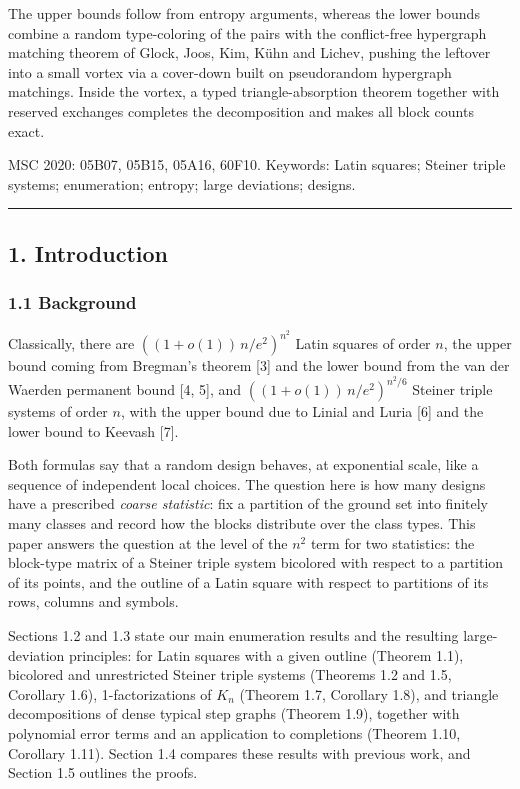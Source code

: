 \documentclass[english,11pt,a4paper]{article}
\begin{document}
The upper bounds follow from entropy arguments, whereas the lower bounds combine a random type-coloring of the pairs with the conflict-free hypergraph matching theorem of Glock, Joos, Kim, Kühn and Lichev, pushing the leftover into a small vortex via a cover-down built on pseudorandom hypergraph matchings. Inside the vortex, a typed triangle-absorption theorem together with reserved exchanges completes the decomposition and makes all block counts exact.

MSC 2020: 05B07, 05B15, 05A16, 60F10. Keywords: Latin squares; Steiner triple systems; enumeration; entropy; large deviations; designs.

\begin{center}\rule{0.5\linewidth}{0.5pt}\end{center}

\subsection{1. Introduction}\label{introduction}

\subsubsection{1.1 Background}\label{background}

Classically, there are \(((1+o(1))\,n/e^2)^{n^2}\) Latin squares of order \(n\), the upper bound coming from Bregman's theorem {[}3{]} and the lower bound from the van der Waerden permanent bound {[}4, 5{]}, and \(((1+o(1))\,n/e^2)^{n^2/6}\) Steiner triple systems of order \(n\), with the upper bound due to Linial and Luria {[}6{]} and the lower bound to Keevash {[}7{]}.

Both formulas say that a random design behaves, at exponential scale, like a sequence of independent local choices. The question here is how many designs have a prescribed \emph{coarse statistic}: fix a partition of the ground set into finitely many classes and record how the blocks distribute over the class types. This paper answers the question at the level of the \(n^2\) term for two statistics: the block-type matrix of a Steiner triple system bicolored with respect to a partition of its points, and the outline of a Latin square with respect to partitions of its rows, columns and symbols.

Sections 1.2 and 1.3 state our main enumeration results and the resulting large-deviation principles: for Latin squares with a given outline (Theorem 1.1), bicolored and unrestricted Steiner triple systems (Theorems 1.2 and 1.5, Corollary 1.6), 1-factorizations of \(K_n\) (Theorem 1.7, Corollary 1.8), and triangle decompositions of dense typical step graphs (Theorem 1.9), together with polynomial error terms and an application to completions (Theorem 1.10, Corollary 1.11). Section 1.4 compares these results with previous work, and Section 1.5 outlines the proofs.
\end{document}
